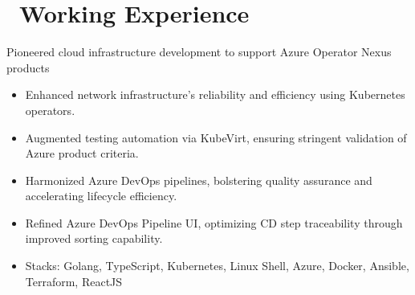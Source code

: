 \documentclass{resume}
\begin{document}
\section{\faUsers\ Working Experience}
Pioneered cloud infrastructure development to support Azure Operator Nexus products
\begin{itemize}
  \item Enhanced network infrastructure's reliability and efficiency using Kubernetes operators.
  \item Augmented testing automation via KubeVirt, ensuring stringent validation of Azure product criteria.
  \item Harmonized Azure DevOps pipelines, bolstering quality assurance and accelerating lifecycle efficiency.
  \item Refined Azure DevOps Pipeline UI, optimizing CD step traceability through improved sorting capability.
  \item Stacks: Golang, TypeScript, Kubernetes, Linux Shell, Azure, Docker, Ansible, Terraform, ReactJS
\end{itemize}
\end{document}
